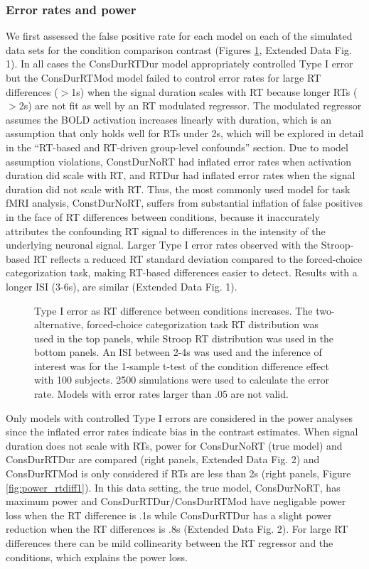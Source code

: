 \documentclass[sn-mathphys,Numbered, super, referee, lineno]{sn-jnl}
\begin{document}
\subsubsection*{Error rates and power}
 
 We first assessed the false positive rate for each model on each of the simulated data sets for the condition comparison contrast (Figures \ref{fig:type1err_24}, Extended Data Fig. 1). In all cases the ConsDurRTDur model appropriately controlled Type I error but the ConsDurRTMod model failed to control error rates for large RT differences ($>$1s) when the signal duration scales with RT because longer RTs ($>$2s) are not fit as well by an RT modulated regressor.  The modulated regressor assumes the BOLD activation increases linearly with duration, which is an assumption that only holds well for RTs under 2s, which will be explored in detail in the ``RT-based and RT-driven group-level confounds'' section. Due to model assumption violations, ConstDurNoRT had inflated error rates when activation duration did scale with RT, and RTDur had inflated error rates when the signal duration did not  scale with RT.  Thus, the most commonly used model for task fMRI analysis, ConstDurNoRT, suffers from substantial inflation of false positives in the face of RT differences between conditions, because it inaccurately attributes the confounding RT signal to differences in the intensity of the underlying neuronal signal.  Larger Type I error rates observed with the Stroop-based RT reflects a reduced RT standard deviation compared to the forced-choice categorization task, making RT-based differences easier to detect.  Results with a longer ISI (3-6s), are similar (Extended Data Fig. 1).

\begin{figure}[ht!]
  \centering
   \caption{Type I error as RT difference between conditions increases.  The two-alternative, forced-choice categorization task RT distribution was used in the top panels, while Stroop RT distribution was used in the bottom panels. An ISI between 2-4s was used and the inference of interest was for the 1-sample t-test of the condition difference effect with 100 subjects.  2500 simulations were used to calculate the error rate. Models with error rates larger than .05 are not valid.}
  \label{fig:type1err_24}
\end{figure}


Only models with controlled Type I errors are considered in the power analyses since the inflated error rates indicate bias in the contrast estimates. When signal duration does not scale with RTs, power for ConsDurNoRT (true model) and ConsDurRTDur are compared (right panels, Extended Data Fig. 2) and ConsDurRTMod is only considered if RTs are less than 2s (right panels, Figure \ref{fig:power_rtdiff1}).  In this data setting, the true model, ConsDurNoRT, has maximum power and ConsDurRTDur/ConsDurRTMod have negligable power loss when the RT difference is .1s while ConsDurRTDur has a slight power reduction when the RT differences is .8s (Extended Data Fig. 2). For large RT differences there can be mild collinearity between the RT regressor and the conditions, which explains the power loss.
\end{document}
